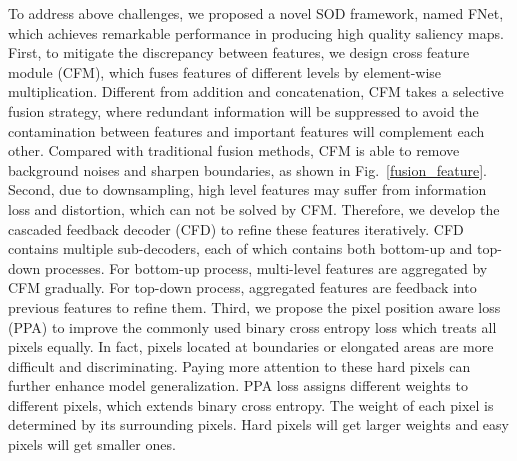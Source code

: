 \documentclass[letterpaper]{article} \usepackage{aaai20}  \usepackage{times}  \usepackage{helvet} \usepackage{courier}  \usepackage[hyphens]{url}  \usepackage{graphicx} \urlstyle{rm} \def\UrlFont{\rm}  \usepackage{graphicx}  \frenchspacing  \setlength{\pdfpagewidth}{8.5in}  \setlength{\pdfpageheight}{11in}
\begin{document}
To address above challenges, we proposed a novel SOD framework, named FNet, which achieves remarkable performance in producing high quality saliency maps. First, to mitigate the discrepancy between features, we design cross feature module (CFM), which fuses features of different levels by element-wise multiplication. Different from addition and concatenation, CFM takes a selective fusion strategy, where redundant information will be suppressed to avoid the contamination between features and important features will complement each other. Compared with traditional fusion methods, CFM is able to remove background noises and sharpen boundaries, as shown in Fig.~\ref{fusion_feature}. Second, due to downsampling, high level features may suffer from information loss and distortion, which can not be solved by CFM. Therefore, we develop the cascaded feedback decoder (CFD) to refine these features iteratively. CFD contains multiple sub-decoders, each of which contains both bottom-up and top-down processes. For bottom-up process, multi-level features are aggregated by CFM gradually. For top-down process, aggregated features are feedback into previous features to refine them. Third, we propose the pixel position aware loss (PPA) to improve the commonly used binary cross entropy loss which treats all pixels equally. In fact, pixels located at boundaries or elongated areas are more difficult and discriminating. Paying more attention to these hard pixels can further enhance model generalization. PPA loss assigns different weights to different pixels, which extends binary cross entropy. The weight of each pixel is determined by its surrounding pixels. Hard pixels will get larger weights and easy pixels will get smaller ones.
\end{document}
